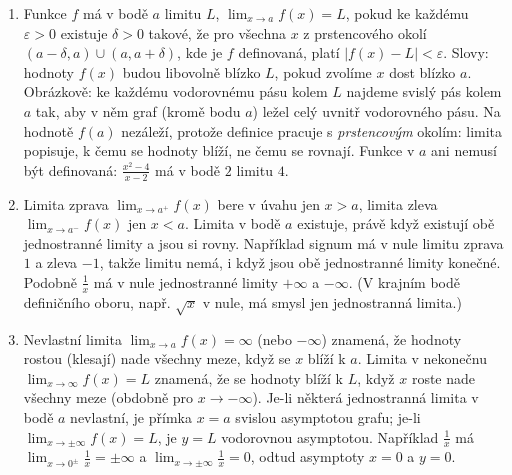 \begin{enumerate}[label=\textbf{\arabic*.}, leftmargin=*, itemsep=0.8em]
  \item {}
  Funkce $f$ má v bodě $a$ limitu $L$, $\lim_{x\to a} f(x) = L$, pokud ke každému $\varepsilon > 0$ existuje $\delta > 0$ takové, že pro všechna $x$ z prstencového okolí $(a - \delta, a)\cup(a, a + \delta)$, kde je $f$ definovaná, platí $|f(x) - L| < \varepsilon$. Slovy: hodnoty $f(x)$ budou libovolně blízko $L$, pokud zvolíme $x$ dost blízko $a$. Obrázkově: ke každému vodorovnému pásu kolem $L$ najdeme svislý pás kolem $a$ tak, aby v něm graf (kromě bodu $a$) ležel celý uvnitř vodorovného pásu. Na hodnotě $f(a)$ nezáleží, protože definice pracuje s \emph{prstencovým} okolím: limita popisuje, k čemu se hodnoty blíží, ne čemu se rovnají. Funkce v $a$ ani nemusí být definovaná: $\frac{x^2 - 4}{x - 2}$ má v bodě $2$ limitu $4$. 

  \item {}
  Limita zprava $\lim_{x\to a^+} f(x)$ bere v úvahu jen $x > a$, limita zleva $\lim_{x\to a^-} f(x)$ jen $x < a$. Limita v bodě $a$ existuje, právě když existují obě jednostranné limity a jsou si rovny. Například signum má v nule limitu zprava $1$ a zleva $-1$, takže limitu nemá, i když jsou obě jednostranné limity konečné. Podobně $\frac{1}{x}$ má v nule jednostranné limity $+\infty$ a $-\infty$. (V krajním bodě definičního oboru, např. $\sqrt{x}$ v nule, má smysl jen jednostranná limita.)

  \item {}
  Nevlastní limita $\lim_{x\to a} f(x) = \infty$ (nebo $-\infty$) znamená, že hodnoty rostou (klesají) nade všechny meze, když se $x$ blíží k $a$. Limita v nekonečnu $\lim_{x\to\infty} f(x) = L$ znamená, že se hodnoty blíží k $L$, když $x$ roste nade všechny meze (obdobně pro $x\to-\infty$). Je-li některá jednostranná limita v bodě $a$ nevlastní, je přímka $x = a$ svislou asymptotou grafu; je-li $\lim_{x\to\pm\infty} f(x) = L$, je $y = L$ vodorovnou asymptotou. Například $\frac{1}{x}$ má $\lim_{x\to 0^\pm}\frac{1}{x} = \pm\infty$ a $\lim_{x\to\pm\infty}\frac{1}{x} = 0$, odtud asymptoty $x = 0$ a $y = 0$. 


\end{enumerate}
